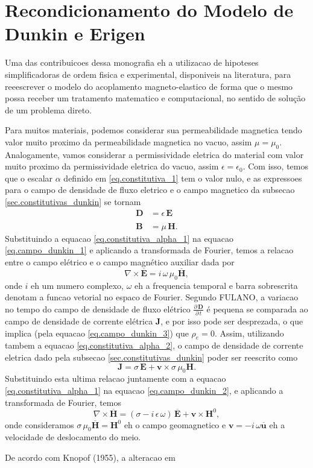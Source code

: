 \chapter{Recondicionamento do Modelo de Dunkin e Erigen}
Uma das contribuicoes dessa monografia eh a utilizacao de hipoteses simplificadoras de ordem fisica e experimental, disponiveis na literatura, para reeescrever o modelo do acoplamento magneto-elastico de forma que o mesmo possa receber um tratamento matematico e computacional, no sentido de solução de um problema direto.

Para muitos materiais, podemos considerar sua permeabilidade magnetica tendo valor muito proximo da permeabilidade magnetica no vacuo, assim $\mu=\mu_0$. Analogamente, vamos considerar a permissividade eletrica do material com valor muito proximo da permissividade eletrica do vacuo, assim $\epsilon=\epsilon_0$. Com isso, temos que o escalar $\alpha$ definido em \ref{eq.constitutiva_1} tem o valor nulo, e as expressoes para o campo de densidade de fluxo eletrico e o campo magnetico da subsecao \ref{sec.constitutivas_dunkin} se tornam
\begin{align}\label{eq.constitutiva_alpha_1}
\mathbf{D}&=\epsilon\,\mathbf{E}\\\nonumber\\\label{eq.constitutiva_alpha_2}
\mathbf{B}&=\mu\,\mathbf{H}.
\end{align}
Substituindo a equacao \ref{eq.constitutiva_alpha_1} na equacao \ref{eq.campo_dunkin_1} e aplicando a transformada de Fourier, temos a relacao entre o campo elétrico e o campo magnético auxiliar dada por
\begin{equation}
\nabla\times\mathbf{\overline{E}}=i\,\omega\,\mu_0\mathbf{\overline{H}},
\end{equation}
onde $i$ eh um numero complexo, $\omega$ eh a frequencia temporal e barra sobrescrita denotam a funcao vetorial no espaco de Fourier.
Segundo FULANO, a variacao no tempo do campo de densidade de fluxo elétrico $\frac{\partial\,\mathbf{D}}{\partial\,t}$ é pequena se comparada ao campo de densidade de corrente elétrica $\mathbf{J}$, e por isso pode ser desprezada, o que implica (pela equacao \ref{eq.campo_dunkin_3}) que $\rho_e=0$. Assim, utilizando tambem a equacao \ref{eq.constitutiva_alpha_2}, o campo de densidade de corrente eletrica dado pela subsecao \ref{sec.constitutivas_dunkin} poder ser reescrito como
\begin{equation}
\mathbf{J}=\sigma\,\mathbf{E}+\mathbf{v}\times\sigma\,\mu_0\mathbf{H}.
\end{equation}
Substituindo esta ultima relacao juntamente com a equacao \ref{eq.constitutiva_alpha_1} na equacao \ref{eq.campo_dunkin_2}, e aplicando a transformada de Fourier, temos
\begin{equation}
\nabla\times\mathbf{\overline{H}}=(\sigma-i\,\epsilon\,\omega)\,\mathbf{\overline{E}}+\mathbf{v}\times\mathbf{H}^0,
\end{equation}
onde consideramos $\sigma\,\mu_0\mathbf{\overline{H}}=\mathbf{H}^0$ eh o campo geomagnetico e $\mathbf{v}=-i\,\omega\mathbf{\overline{u}}$ eh a velocidade de deslocamento do meio.

De acordo com Knopof (1955), a alteracao em 